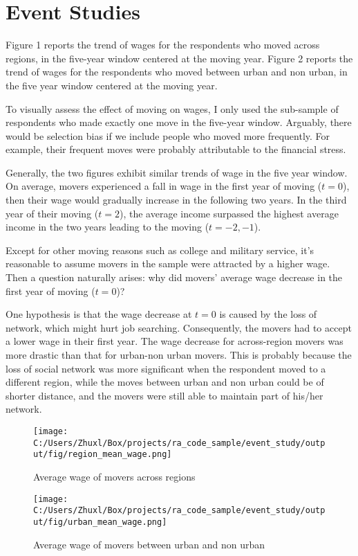 \documentclass[12pt]{article}
\begin{document}
\section{Event Studies} 

Figure 1 reports the trend of wages for the respondents who moved across regions, in the five-year window centered at the moving year. Figure 2 reports the trend of wages for the respondents who moved between urban and non urban, in the five year window centered at the moving year. 

To visually assess the effect of moving on wages, I only used the sub-sample of respondents who made exactly one move in the five-year window. Arguably, there would be selection bias if we include people who moved more frequently. For example, their frequent moves were probably attributable to the financial stress. 

Generally, the two figures exhibit similar trends of wage in the five year window. On average, movers experienced a fall in wage in the first year of moving ($t = 0$), then their wage would gradually increase in the following two years. In the third year of their moving ($ t = 2$), the average income surpassed the highest average income in the two years leading to the moving ($t = -2, -1$).

Except for other moving reasons such as college and military service, it's reasonable to assume movers in the sample were attracted by a higher wage. Then a question naturally arises: why did movers' average wage decrease in the first year of moving ($t = 0$)? 

One hypothesis is that the wage decrease at $t = 0$ is caused by the loss of network, which might hurt job searching. Consequently, the movers had to accept a lower wage in their first year. The wage decrease for across-region movers was more drastic than that for urban-non urban movers. This is probably because the loss of social network was more significant when the respondent moved to a different region, while the moves between urban and non urban could be of shorter distance, and the movers were still able to maintain part of his/her network. 
\begin{figure}[H]
\caption{Average wage of movers across regions}
\texttt{[image: C:/Users/Zhuxl/Box/projects/ra\_code\_sample/event\_study/output/fig/region\_mean\_wage.png]}
\end{figure}

\begin{figure}[H]
\caption{Average wage of movers between urban and non urban}
\texttt{[image: C:/Users/Zhuxl/Box/projects/ra\_code\_sample/event\_study/output/fig/urban\_mean\_wage.png]}
\end{figure}
\end{document}
